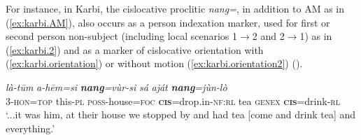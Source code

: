 \documentclass[oneside,a4paper,11pt]{article}
\newcommand{\ipa}[1]{{\phon\textit{#1}}}
\newcommand{\zh}[1]{{\cn #1}}
\newcommand{\rouge}[1]{\textbf{#1}}
\newcommand{\gray}[1]{\cellcolor{lightgray!30}{#1}}
\begin{document}



For instance, in Karbi, the cislocative proclitic \ipa{nang=}, in addition to AM as in (\ref{ex:karbi.AM}), also occurs as a person indexation marker, used for first or second person non-subject (including local scenarios 1$\rightarrow$2  and 2$\rightarrow$1) as in (\ref{ex:karbi.2}) and as a marker of cislocative orientation with (\ref{ex:karbi.orientation}) or without motion (\ref{ex:karbi.orientation2}) (\citet{konnerth15cisloc}).

\begin{exe}
\ex \label{ex:karbi.AM}
\gll \ipa{alàng-lì=ke}	\ipa{là-tūm}	\ipa{a-hēm=si}	\ipa{\rouge{nang}=vùr-si}	\ipa{sá}	\ipa{aját}	\ipa{\rouge{nang}=jùn-lò} \\
 3-\textsc{hon}=\textsc{top} this-\textsc{pl} \textsc{poss}-house=\textsc{foc} \rouge{\textsc{cis}}=drop.in-\textsc{nf}:\textsc{rl} tea \textsc{genex} \rouge{\textsc{cis}}=drink-\textsc{rl} \\
 \glt `...it was him, at their house we stopped by and had tea [{come} and drink tea] and everything.'
\end{exe}
\end{document}
